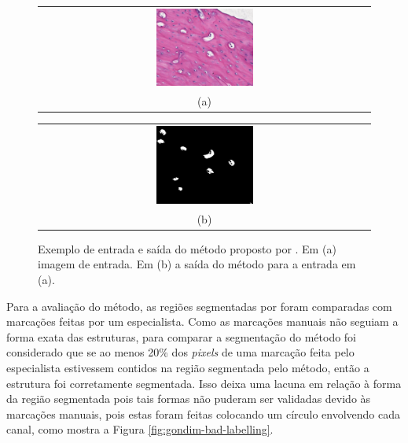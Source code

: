\begin{figure}[h]
    \center
    \begin{tabular}{@{}c@{}}
        \includegraphics[width=0.3\textwidth]{figures/2_theoric_foundamentations/pedro/input.png}
        \\[\abovecaptionskip]
    \small (a)
    \end{tabular}
    \begin{tabular}{@{}c@{}}
        \includegraphics[width=0.3\textwidth]{figures/2_theoric_foundamentations/pedro/output.png}
        \\[\abovecaptionskip]
    \small (b)
    \end{tabular}

    
    \caption[Exemplo de entrada e saída do método proposto por \cite{gondim2021automatic}]{Exemplo de entrada e saída do método proposto por \cite{gondim2021automatic}. Em (a) imagem de entrada. Em (b) a saída do método para a entrada em (a).}
    \label{fig:gondim-input-output}
\end{figure}

Para a avaliação do método, as regiões segmentadas por \cite{gondim2021automatic} foram comparadas com marcações feitas por um especialista. 
Como as marcações manuais não seguiam a forma exata das estruturas, para comparar a segmentação do método foi considerado que se ao menos 20\% dos \textit{pixels} de uma marcação feita pelo especialista estivessem contidos na região segmentada pelo método, então a estrutura foi corretamente segmentada. Isso deixa uma lacuna em relação à forma da região segmentada pois tais formas não puderam ser validadas devido às marcações manuais, pois estas foram feitas colocando um círculo envolvendo cada canal, como mostra a Figura \ref{fig:gondim-bad-labelling}.

